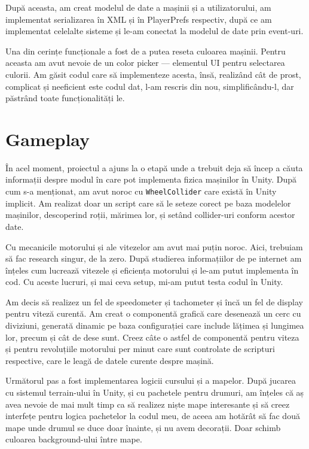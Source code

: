 \documentclass[a4paper,12pt]{report}
\begin{document}
După aceasta, am creat modelul de date a mașinii și a utilizatorului, am implementat serializarea în \ac{XML} și în PlayerPrefs respectiv, după ce am implementat celelalte sisteme și le-am conectat la modelul de date prin event-uri.

Una din cerințe funcționale a fost de a putea reseta culoarea mașinii.
Pentru aceasta am avut nevoie de un color picker --- elementul \ac{UI} pentru selectarea culorii.
Am găsit codul care să implementeze acesta, însă, realizând cât de prost, complicat și neeficient este codul dat, l-am rescris din nou, simplificându-l, dar păstrând toate funcționalități le.


\section{Gameplay}

În acel moment, proiectul a ajuns la o etapă unde a trebuit deja să încep a căuta informații despre modul în care pot implementa fizica mașinilor în Unity.
După cum s-a menționat, am avut noroc cu \texttt{WheelCollider} care există în Unity implicit.
Am realizat doar un script care să le seteze corect pe baza modelelor mașinilor, descoperind roții, mărimea lor, și setând collider-uri conform acestor date.

Cu mecanicile motorului și ale vitezelor am avut mai puțin noroc.
Aici, trebuiam să fac research singur, de la zero.
După studierea informațiilor de pe internet am înțeles cum lucrează vitezele și eficiența motorului și le-am putut implementa în cod.
Cu aceste lucruri, și mai ceva setup, mi-am putut testa codul în Unity.

Am decis să realizez un fel de speedometer și tachometer și încă un fel de display pentru viteză curentă.
Am creat o componentă grafică care desenează un cerc cu diviziuni, generată dinamic pe baza configurației care include lățimea și lungimea lor, precum și cât de dese sunt.
Creez câte o astfel de componentă pentru viteza și pentru revoluțiile motorului per minut care sunt controlate de scripturi respective, care le leagă de datele curente despre mașină.

Următorul pas a fost implementarea logicii cursului și a mapelor.
După jucarea cu sistemul terrain-ului în Unity, și cu pachetele pentru drumuri, am înțeles că aș avea nevoie de mai mult timp ca să realizez niște mape interesante și să creez interfețe pentru logica pachetelor la codul meu, de aceea am hotărât să fac două mape unde drumul se duce doar înainte, și nu avem decorații.
Doar schimb culoarea background-ului între mape.
\end{document}
